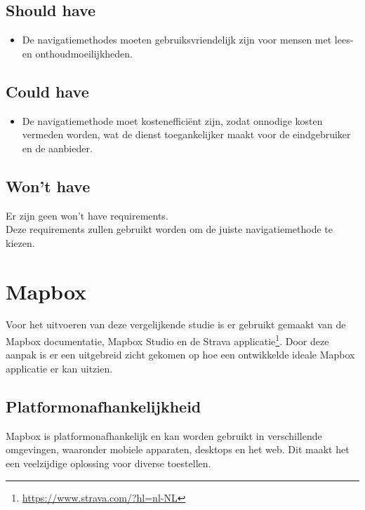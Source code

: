 \subsection*{Should have}
\begin{itemize}
    \item De navigatiemethodes moeten gebruiksvriendelijk zijn voor mensen met lees- en onthoudmoeilijkheden.
\end{itemize}

\subsection*{Could have}
\begin{itemize}
    \item De navigatiemethode moet kostenefficiënt zijn, zodat onnodige kosten vermeden worden, wat de dienst toegankelijker maakt voor de eindgebruiker en de aanbieder.
\end{itemize}

\subsection*{Won't have}

Er zijn geen won't have requirements.\\

Deze requirements zullen gebruikt worden om de juiste navigatiemethode te kiezen.



\section{Mapbox}
\label{sec:mapbox}

Voor het uitvoeren van deze vergelijkende studie is er gebruikt gemaakt van de Mapbox documentatie, Mapbox Studio en de Strava applicatie\footnote{\url{https://www.strava.com/?hl=nl-NL}}. Door deze aanpak is er een uitgebreid zicht gekomen op hoe een ontwikkelde ideale Mapbox applicatie er kan uitzien.

\subsection*{Platformonafhankelijkheid}
Mapbox is platformonafhankelijk en kan worden gebruikt in verschillende omgevingen, waaronder mobiele apparaten, desktops en het web. Dit maakt het een veelzijdige oplossing voor diverse toestellen.

